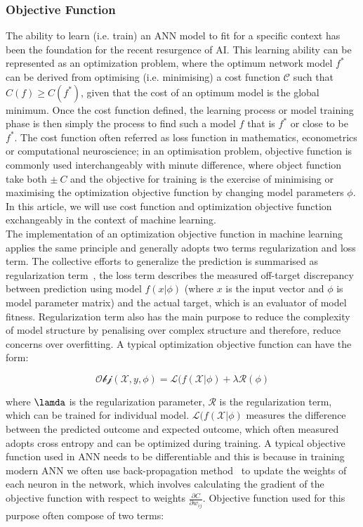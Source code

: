 \subsubsection{Objective Function}
The ability to learn (i.e. train) an ANN model to fit for a specific context has been the foundation for the recent resurgence of AI. This learning ability can be represented as an optimization problem, where the optimum network model $f^*$ can be derived from optimising (i.e. minimising) a cost function $\mathcal{C}$ such that $C(f) \geq C(f^*)$, given that the cost of an optimum model is the global minimum. Once the cost function defined, the learning process or model training phase is then simply the process to find such a model $f$ that is $f^*$ or close to be $f^*$. The cost function often referred as loss function in mathematics, econometrics or computational neuroscience; in an optimisation problem, objective function is commonly used interchangeably with minute difference, where object function take both $\pm~C$ and the objective for training is the exercise of minimising or maximising the optimization objective function by changing model parameters $\phi$. In this article, we will use cost function and optimization objective function exchangeably in the context of machine learning.
\\
The implementation of an optimization objective function in machine learning applies the same principle and generally adopts two terms regularization and loss term. The collective efforts to generalize the prediction is summarised as regularization term~\cite{goodfellow_2015}, the loss term describes the measured off-target discrepancy between prediction using model $f(x|\phi)$ (where $x$ is the input vector and $\phi$ is model parameter matrix) and the actual target, which is an evaluator of model fitness. Regularization term also has the main purpose to reduce the complexity of model structure by penalising over complex structure and therefore, reduce concerns over overfitting. A typical optimization objective function can have the form:

\begin{equation}
    \mathcal{Obj}(\mathcal{X},y,\phi) = \mathcal{L}(f(\mathcal{X}|\phi) + \lambda \mathcal{R} (\phi) 
\end{equation}

where $\lamda$ is the regularization parameter, $\mathcal{R}$ is the regularization term, which can be trained for individual model. $\mathcal{L}(f(\mathcal{X}|\phi)$ measures the difference between the predicted outcome and expected outcome, which often measured adopts cross entropy and can be optimized during training. A typical objective function used in ANN needs to be differentiable and this is because in training modern ANN we often use back-propagation method~\cite{LeCun_2015,Heaton_2017} to update the weights of each neuron in the network, which involves calculating the gradient of the objective function with respect to weights $\frac {\partial{C}} {\partial{w_{ij}}} $. Objective function used for this purpose often compose of two terms: 